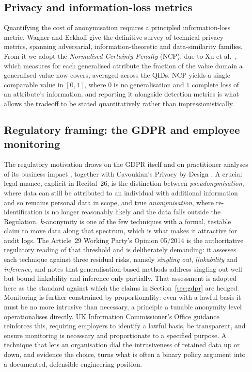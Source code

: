 \documentclass[10pt,a4paper]{article}
\begin{document}
\subsection{Privacy and information-loss metrics}
Quantifying the cost of anonymisation requires a principled information-loss metric. Wagner and Eckhoff \cite{wagner2018} give the definitive survey of technical privacy metrics, spanning adversarial, information-theoretic and data-similarity families. From it we adopt the \emph{Normalised Certainty Penalty} (NCP), due to Xu et al.\ \cite{xu2006}, which measures for each generalised attribute the fraction of the value domain a generalised value now covers, averaged across the QIDs. NCP yields a single comparable value in $[0,1]$, where $0$ is no generalisation and $1$ complete loss of an attribute's information, and reporting it alongside detection metrics is what allows the tradeoff to be stated quantitatively rather than impressionistically.

\subsection{Regulatory framing: the GDPR and employee monitoring}
The regulatory motivation draws on the GDPR itself and on practitioner analyses of its business impact \cite{voigt2017,tankard2016}, together with Cavoukian's Privacy by Design \cite{cavoukian2011}. A crucial legal nuance, explicit in Recital~26, is the distinction between \emph{pseudonymisation}, where data can still be attributed to an individual with additional information and so remains personal data in scope, and true \emph{anonymisation}, where re-identification is no longer reasonably likely and the data falls outside the Regulation. $k$-anonymity is one of the few techniques with a formal, testable claim to move data along that spectrum, which is what makes it attractive for audit logs. The Article~29 Working Party's Opinion 05/2014 \cite{wp29anon2014} is the authoritative regulatory reading of that threshold and is deliberately demanding: it assesses each technique against three residual risks, namely \emph{singling out}, \emph{linkability} and \emph{inference}, and notes that generalisation-based methods address singling out well but bound linkability and inference only partially. That assessment is adopted here as the standard against which the claims in Section~\ref{sec:gdpr} are hedged. Monitoring is further constrained by proportionality: even with a lawful basis it must be no more intrusive than necessary, a principle a tunable anonymity level operationalises directly. UK Information Commissioner's Office guidance \cite{ico2023} reinforces this, requiring employers to identify a lawful basis, be transparent, and ensure monitoring is necessary and proportionate to a specified purpose. A technique that lets an organisation dial the intrusiveness of retained data up or down, and evidence the choice, turns what is often a binary policy argument into a documented, defensible engineering position.
\end{document}
